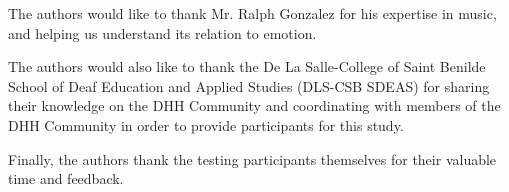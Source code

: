 
\begin{acks}
The authors would like to thank Mr. Ralph Gonzalez for his expertise in music, and helping us understand its relation to emotion.

The authors would also like to thank the De La Salle-College of Saint Benilde School of Deaf Education and Applied Studies (DLS-CSB SDEAS) for sharing their knowledge on the DHH Community and coordinating with members of the DHH Community in order to provide participants for this study.

Finally, the authors thank the testing participants themselves for their valuable time and feedback.
\end{acks}